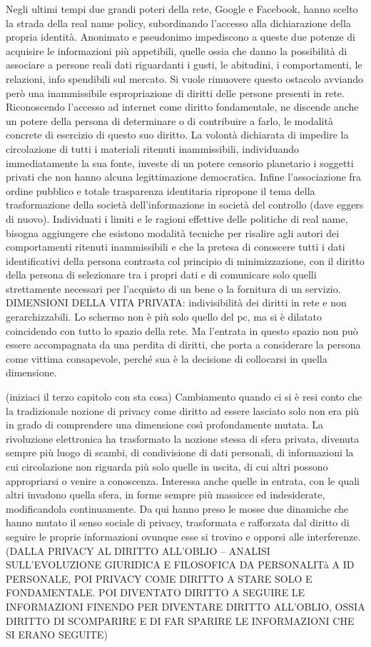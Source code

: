 Negli ultimi tempi due grandi poteri della rete, Google e Facebook, hanno scelto la strada della real name policy, subordinando l’accesso alla dichiarazione della propria identità. Anonimato e pseudonimo impediscono a queste due potenze di acquisire le informazioni più appetibili, quelle ossia che danno la possibilità di associare a persone reali dati riguardanti i gusti, le abitudini, i comportamenti, le relazioni, info spendibili sul mercato. Si vuole rimuovere questo ostacolo avviando però una inammissibile espropriazione di diritti delle persone presenti in rete.
Riconoscendo l’accesso ad internet come diritto fondamentale, ne discende anche un potere della persona di determinare o di contribuire a farlo, le modalità concrete di esercizio di questo suo diritto.
La volontà dichiarata di impedire la circolazione di tutti i materiali ritenuti inammissibili,  individuando immediatamente la sua fonte, investe di un potere censorio planetario i soggetti privati che non hanno alcuna legittimazione democratica. Infine l’associazione fra ordine pubblico e totale trasparenza identitaria ripropone il tema della trasformazione della società dell’informazione in società del controllo (dave eggers di nuovo).
Individuati i limiti e le ragioni effettive delle politiche di real name, bisogna aggiungere che esistono modalità tecniche per risalire agli autori dei comportamenti ritenuti inammissibili e che la pretesa di conoscere tutti i dati identificativi della persona contrasta col principio di minimizzazione, con il diritto della persona di selezionare tra i propri dati e di comunicare solo quelli strettamente necessari per l’acquisto di un bene o la fornitura di un servizio.
DIMENSIONI DELLA VITA PRIVATA:
indivisibilità dei diritti in rete e non gerarchizzabili. Lo schermo non è più solo quello del pc, ma si è dilatato coincidendo con tutto lo spazio della rete. Ma l’entrata in questo spazio non può essere accompagnata da una perdita di diritti, che porta a considerare la persona come vittima consapevole, perché sua è la decisione di collocarsi in quella dimensione.

(iniziaci il terzo capitolo con sta cosa)
Cambiamento quando ci si è resi conto che la tradizionale nozione di privacy come diritto ad essere lasciato solo non era più in grado di comprendere una dimensione così profondamente mutata. La rivoluzione elettronica ha trasformato la nozione stessa di sfera privata, divenuta sempre più luogo di scambi, di condivisione di dati personali, di informazioni la cui circolazione non riguarda più solo quelle in uscita, di cui altri possono appropriarsi o venire a conoscenza. Interessa anche quelle in entrata, con le quali altri invadono quella sfera, in forme sempre più massicce ed indesiderate, modificandola continuamente.
Da qui hanno preso le mosse due dinamiche che hanno mutato il senso sociale di privacy, trasformata e rafforzata dal diritto di seguire le proprie informazioni ovunque esse si trovino e opporsi alle interferenze.
(DALLA PRIVACY AL DIRITTO ALL’OBLIO – ANALISI SULL’EVOLUZIONE GIURIDICA E FILOSOFICA 
DA PERSONALITà A ID PERSONALE, POI PRIVACY COME DIRITTO A STARE SOLO E FONDAMENTALE. POI DIVENTATO DIRITTO A SEGUIRE LE INFORMAZIONI FINENDO PER DIVENTARE DIRITTO ALL’OBLIO, OSSIA DIRITTO DI SCOMPARIRE E DI FAR SPARIRE LE INFORMAZIONI CHE SI ERANO SEGUITE)
